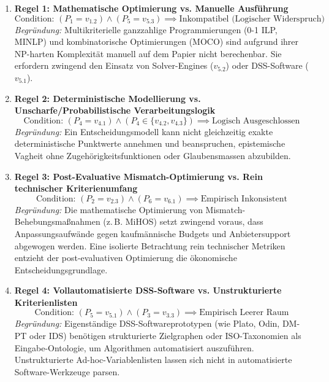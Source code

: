 \begin{enumerate}
    \item \textbf{Regel 1: Mathematische Optimierung vs. Manuelle Ausführung}
    \begin{equation}
    \text{Condition: } (P_1 = v_{1.2}) \land (P_5 = v_{5.3}) \implies \text{Inkompatibel (Logischer Widerspruch)}
    \end{equation}
    \textit{Begründung:} Multikriterielle ganzzahlige Programmierungen (0-1 ILP, MINLP) und kombinatorische Optimierungen (MOCO) sind aufgrund ihrer NP-harten Komplexität manuell auf dem Papier nicht berechenbar. Sie erfordern zwingend den Einsatz von Solver-Engines ($v_{5.2}$) oder DSS-Software ($v_{5.1}$).
    
    \item \textbf{Regel 2: Deterministische Modellierung vs. Unscharfe/Probabilistische Verarbeitungslogik}
    \begin{equation}
    \text{Condition: } (P_4 = v_{4.1}) \land (P_4 \in \{v_{4.2}, v_{4.3}\}) \implies \text{Logisch Ausgeschlossen}
    \end{equation}
    \textit{Begründung:} Ein Entscheidungsmodell kann nicht gleichzeitig exakte deterministische Punktwerte annehmen und beanspruchen, epistemische Vagheit ohne Zugehörigkeitsfunktionen oder Glaubensmassen abzubilden.
    
    \item \textbf{Regel 3: Post-Evaluative Mismatch-Optimierung vs. Rein technischer Kriterienumfang}
    \begin{equation}
    \text{Condition: } (P_2 = v_{2.3}) \land (P_6 = v_{6.1}) \implies \text{Empirisch Inkonsistent}
    \end{equation}
    \textit{Begründung:} Die mathematische Optimierung von Mismatch-Behebungsmaßnahmen (z.\,B. MiHOS) setzt zwingend voraus, dass Anpassungsaufwände gegen kaufmännische Budgets und Anbietersupport abgewogen werden. Eine isolierte Betrachtung rein technischer Metriken entzieht der post-evaluativen Optimierung die ökonomische Entscheidungsgrundlage.
    
    \item \textbf{Regel 4: Vollautomatisierte DSS-Software vs. Unstrukturierte Kriterienlisten}
    \begin{equation}
    \text{Condition: } (P_5 = v_{5.1}) \land (P_3 = v_{3.3}) \implies \text{Empirisch Leerer Raum}
    \end{equation}
    \textit{Begründung:} Eigenständige DSS-Softwareprototypen (wie Plato, Odin, DM-PT oder IDS) benötigen strukturierte Zielgraphen oder ISO-Taxonomien als Eingabe-Ontologie, um Algorithmen automatisiert auszuführen. Unstrukturierte Ad-hoc-Variablenlisten lassen sich nicht in automatisierte Software-Werkzeuge parsen.
\end{enumerate}

